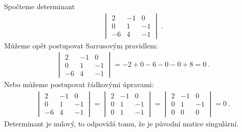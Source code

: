 \begin{example}
    Spočteme determinant
    \begin{align}
        \begin{vmatrix}
            2 & -1 & 0 \\
            0 & 1 & -1 \\
            -6 & 4 & -1
        \end{vmatrix} \:.
    \end{align}
    Můžeme opět postupovat Sarrusovým pravidlem:
    \begin{align}
        \begin{vmatrix}
            2 & -1 & 0 \\
            0 & 1 & -1 \\
            -6 & 4 & -1
        \end{vmatrix} = -2 + 0 -6 - 0 - 0 +8 =0 \:.
    \end{align}
    Nebo můžeme postupovat řádkovými úpravami:
    \begin{align}
        \begin{vmatrix}
            2 & -1 & 0 \\
            0 & 1 & -1 \\
            -6 & 4 & -1
        \end{vmatrix} 
        =
        \begin{vmatrix}
            2 & -1 & 0 \\
            0 & 1 & -1 \\
            0 & 1 & -1
        \end{vmatrix}
        =
        \begin{vmatrix}
            2 & -1 & 0 \\
            0 & 1 & -1 \\
            0 & 0 & 0
        \end{vmatrix}
        = 0 \:.
    \end{align}
    Determinant je nulový, to odpovídá tomu, že je původní matice singulární.
\end{example}